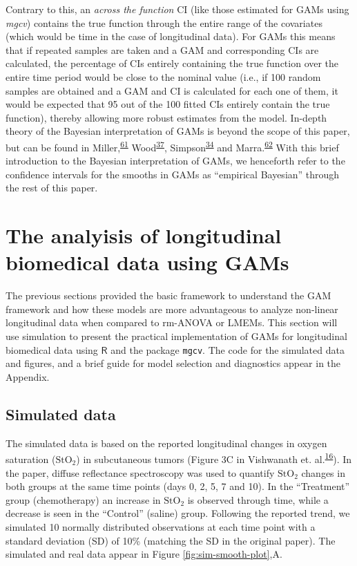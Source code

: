 \documentclass[
]{article}
\newcommand{\passthrough}[1]{#1}
\begin{document}
Contrary to this, an \emph{across the function} CI (like those estimated for GAMs using \emph{mgcv}) contains the true function through the entire range of the covariates (which would be time in the case of longitudinal data). For GAMs this means that if repeated samples are taken and a GAM and corresponding CIs are calculated, the percentage of CIs entirely containing the true function over the entire time period would be close to the nominal value (i.e., if 100 random samples are obtained and a GAM and CI is calculated for each one of them, it would be expected that 95 out of the 100 fitted CIs entirely contain the true function), thereby allowing more robust estimates from the model. In-depth theory of the Bayesian interpretation of GAMs is beyond the scope of this paper, but can be found in Miller,\textsuperscript{\protect\hyperlink{ref-miller2019}{61}} Wood\textsuperscript{\protect\hyperlink{ref-wood2017}{37}}, Simpson\textsuperscript{\protect\hyperlink{ref-simpson2018}{34}} and Marra.\textsuperscript{\protect\hyperlink{ref-marra2012}{62}} With this brief introduction to the Bayesian interpretation of GAMs, we henceforth refer to the confidence intervals for the smooths in GAMs as ``empirical Bayesian'' through the rest of this paper.

\hypertarget{longitudinal-GAMs}{%
\section{The analyisis of longitudinal biomedical data using GAMs}\label{longitudinal-GAMs}}

The previous sections provided the basic framework to understand the GAM framework and how these models are more advantageous to analyze non-linear longitudinal data when compared to rm-ANOVA or LMEMs. This section will use simulation to present the practical implementation of GAMs for longitudinal biomedical data using \(\textsf{R}\) and the package \passthrough{\lstinline!mgcv!}. The code for the simulated data and figures, and a brief guide for model selection and diagnostics appear in the Appendix.

\hypertarget{simulated-data}{%
\subsection{Simulated data}\label{simulated-data}}

The simulated data is based on the reported longitudinal changes in oxygen saturation (\(\mbox{StO}_2\)) in subcutaneous tumors (Figure 3C in Vishwanath et. al.\textsuperscript{\protect\hyperlink{ref-vishwanath2009}{16}}). In the paper, diffuse reflectance spectroscopy was used to quantify \(\mbox{StO}_2\) changes in both groups at the same time points (days 0, 2, 5, 7 and 10). In the ``Treatment'' group (chemotherapy) an increase in \(\mbox{StO}_2\) is observed through time, while a decrease is seen in the ``Control'' (saline) group. Following the reported trend, we simulated 10 normally distributed observations at each time point with a standard deviation (SD) of 10\% (matching the SD in the original paper).
The simulated and real data appear in Figure \ref{fig:sim-smooth-plot},A.
\end{document}
